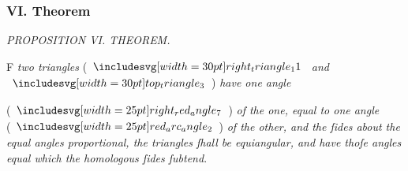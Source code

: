 \documentclass[11pt,preview]{standalone}
\begin{document}
\subsubsection{VI. Theorem}

\begin{minipage}[t]{0.43\textwidth}
    \vspace{20pt}
    
\end{minipage}%
\hfill
\begin{minipage}[t]{0.54\textwidth}
    \begin{center}
        \textit{PROPOSITION VI. THEOREM.}\label{book6pr6} \\
    \end{center}

    \hfill

    \begin{center}
        \raggedright \lettrine[lines=3, loversize=1, nindent=0pt]{}{}F \textit{two triangles} (\hspace{-1ex}$\img[0][0][30]{right_triangle_11}$ \textit{and}\\ $\img[0][0][30]{top_triangle_3}$\hspace{-1ex}) \textit{have one angle}
    \end{center}
    \raggedright (\hspace{-1ex}$\img{right_red_angle_7}$\hspace{-1ex}) \textit{of the one, equal to one angle}\\ (\hspace{-1ex}$\img{red_arc_angle_2}$\hspace{-1ex}) \textit{of the other, and the ſides about the equal angles proportional, the triangles ſhall be equiangular, and have thoſe angles equal which the homologous ſides ſubtend}.
\end{minipage}

\hfill

\hfill
\end{document}
